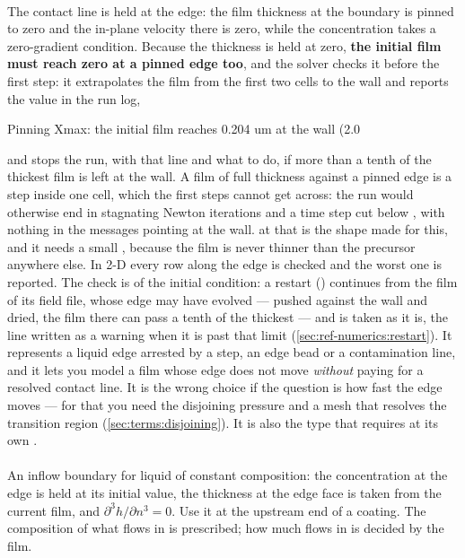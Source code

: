 \paragraph{} The contact line is held at the edge: the film
thickness at the boundary is pinned to zero and the in-plane velocity there is
zero, while the concentration takes a zero-gradient condition. Because the thickness is held at zero, \textbf{the initial film must reach
zero at a pinned edge too}, and the solver checks it before the first step: it
extrapolates the film from the first two cells to the wall and reports the
value in the run log,
\begin{plain}
Pinning Xmax: the initial film reaches 0.204 um at the wall (2.0 %
\end{plain}
and stops the run, with that line and what to do, if more than a tenth of the
thickest film is left at the wall. A film of full thickness against a pinned
edge is a step inside one cell, which the first steps cannot get across: the
run would otherwise end in stagnating Newton iterations and a time step cut
below , with nothing in the messages pointing at the wall.
 at that  is the shape
made for this, and it needs a small , because the film is
never thinner than the precursor anywhere else. In 2-D every row along the edge
is checked and the worst one is reported. The check is of the initial
condition: a restart () continues from the film of its
field file, whose edge may have evolved --- pushed against the wall and dried,
the film there can pass a tenth of the thickest --- and is taken as it is, the
line written as a warning when it is past that limit
(\cref{sec:ref-numerics:restart}). It represents a
liquid edge arrested by a step, an edge bead or a contamination line, and it
lets you model a film whose edge does not move \emph{without} paying for a
resolved contact line. It is the wrong choice if the question is how fast the
edge moves --- for that you need the disjoining pressure and a mesh that
resolves the transition region (\cref{sec:terms:disjoining}). It is also the
type that  requires at its own
.

\paragraph{} An inflow boundary for liquid of constant
composition: the concentration at the edge is held at its initial value, the
thickness at the edge face is taken from the current film, and
$\partial^3 h/\partial n^3 = 0$. Use it at the upstream end of a coating. The
composition of what flows in is prescribed; how much flows in is decided by
the film.

